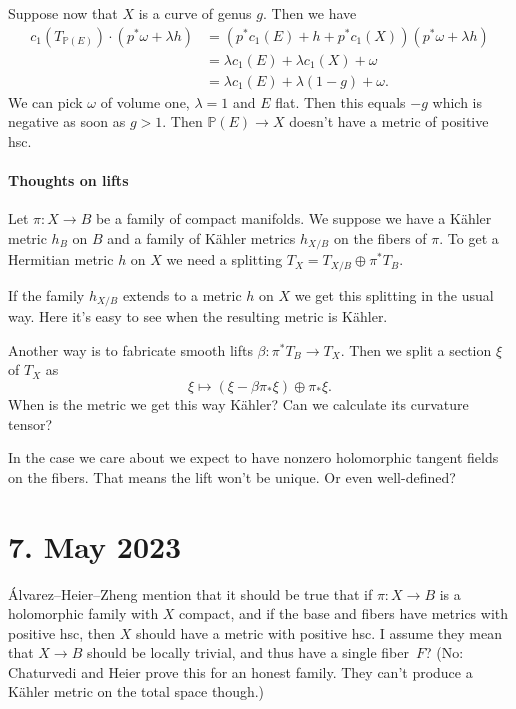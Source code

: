 \documentclass[11pt]{amsart}
\theoremstyle{definition}
\newcommand{\kk}[1]{\mathbb{#1}}
\begin{document}
Suppose now that $X$ is a curve of genus $g$. Then we have
\begin{align*}
c_1(T_{\kk P(E)}) \cdot (p^* \omega + \lambda h)
&= (p^*c_1(E) + h + p^* c_1(X))(p^* \omega + \lambda h)
\\
&= \lambda c_1(E) + \lambda c_1(X) + \omega
\\
&= \lambda c_1(E) + \lambda (1-g) + \omega.
\end{align*}
We can pick $\omega$ of volume one, $\lambda = 1$ and $E$ flat.
Then this equals $-g$ which is negative as soon as $g > 1$.
Then $\kk P(E) \to X$ doesn't have a metric of positive hsc.



\paragraph{Thoughts on lifts}

Let $\pi : X \to B$ be a family of compact manifolds.
We suppose we have a K\"ahler metric $h_B$ on $B$ and a family of K\"ahler
metrics $h_{X/B}$ on the fibers of $\pi$.
To get a Hermitian metric $h$ on $X$ we need a splitting $T_X = T_{X/B} \oplus
\pi^* T_B$.

If the family $h_{X/B}$ extends to a metric $h$ on $X$ we get this splitting in
the usual way.
Here it's easy to see when the resulting metric is K\"ahler.

Another way is to fabricate smooth lifts $\beta : \pi^*T_B \to T_X$.
Then we split a section $\xi$ of $T_X$ as
$$
\xi \mapsto (\xi - \beta \pi_* \xi) \oplus \pi_* \xi.
$$
When is the metric we get this way K\"ahler?
Can we calculate its curvature tensor?

In the case we care about we expect to have nonzero holomorphic tangent fields
on the fibers. That means the lift won't be unique.
Or even well-defined?


\section{7. May 2023}

\'Alvarez--Heier--Zheng mention that it should be true that if $\pi : X \to B$
is a holomorphic family with $X$ compact, and if the base and fibers have
metrics with positive hsc, then $X$ should have a metric with positive hsc.
I assume they mean that $X \to B$ should be locally trivial, and thus have a
single fiber~$F$?
(No: Chaturvedi and Heier prove this for an honest family.
They can't produce a K\"ahler metric on the total space though.)
\end{document}

